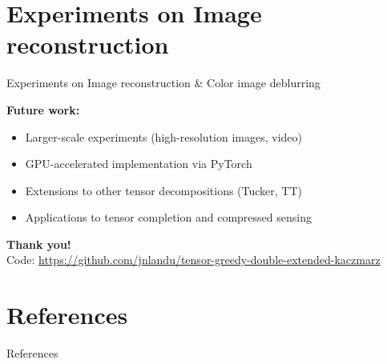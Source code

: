 \documentclass[aspectratio=169]{beamer}
\begin{document}
\section{Experiments on Image reconstruction}
\begin{frame}{Experiments on Image reconstruction \& Color image deblurring}

\end{frame}
\begin{frame}
    \textbf{Future work:}
  \begin{itemize}
    \item Larger-scale experiments (high-resolution images, video)
    \item GPU-accelerated implementation via PyTorch
    \item Extensions to other tensor decompositions (Tucker, TT)
    \item Applications to tensor completion and compressed sensing
  \end{itemize}
\end{frame}
\begin{frame}
  \begin{center}
    \textbf{Thank you!}
    \\[10pt]
    Code: \url{https://github.com/jnlandu/tensor-greedy-double-extended-kaczmarz}
  \end{center}
\end{frame}

\section{References}
\begin{frame}{References}
    \tiny
    \nocite{*}
    
    
\end{frame}
\end{document}
